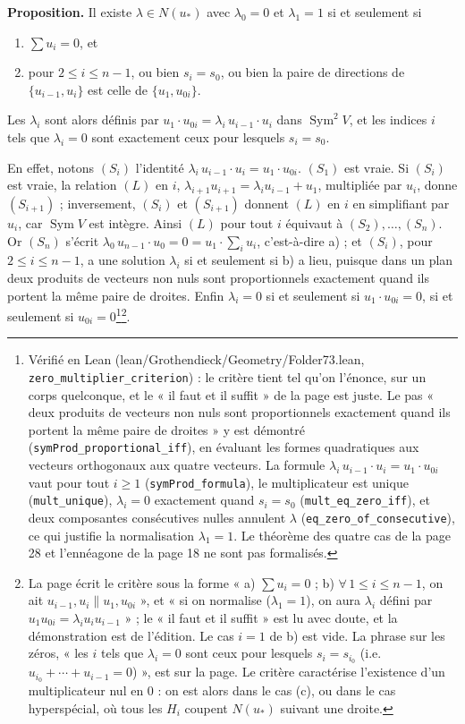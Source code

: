 \documentclass[11pt,a4paper]{article}
\begin{document}
\textbf{Proposition.} Il existe $\lambda \in N(u_*)$ avec $\lambda_0 = 0$ et
$\lambda_1 = 1$ si et seulement si
\begin{enumerate}
  \item[a)] $\sum u_i = 0$, et
  \item[b)] pour $2 \leqslant i \leqslant n-1$, ou bien $s_i = s_0$, ou bien
    la paire de directions de $\{u_{i-1}, u_i\}$ est celle de
    $\{u_1, u_{0i}\}$.
\end{enumerate}
Les $\lambda_i$ sont alors définis par $u_1 \cdot u_{0i} = \lambda_i\, u_{i-1}
\cdot u_i$ dans $\operatorname{Sym}^2 V$, et les indices $i$ tels que
$\lambda_i = 0$ sont exactement ceux pour lesquels $s_i = s_0$.

En effet, notons $(S_i)$ l'identité $\lambda_i\, u_{i-1} \cdot u_i = u_1 \cdot
u_{0i}$. $(S_1)$ est vraie. Si $(S_i)$ est vraie, la relation $(L)$ en $i$,
$\lambda_{i+1} u_{i+1} = \lambda_i u_{i-1} + u_1$, multipliée par $u_i$, donne
$(S_{i+1})$ ; inversement, $(S_i)$ et $(S_{i+1})$ donnent $(L)$ en $i$ en
simplifiant par $u_i$, car $\operatorname{Sym} V$ est intègre. Ainsi $(L)$ pour
tout $i$ équivaut à $(S_2), \ldots, (S_n)$. Or $(S_n)$ s'écrit
$\lambda_0\, u_{n-1} \cdot u_0 = 0 = u_1 \cdot \sum_i u_i$, c'est-à-dire a) ; et
$(S_i)$, pour $2 \leqslant i \leqslant n-1$, a une solution $\lambda_i$ si et
seulement si b) a lieu, puisque dans un plan deux produits de vecteurs non nuls
sont proportionnels exactement quand ils portent la même paire de droites.
Enfin $\lambda_i = 0$ si et seulement si $u_1 \cdot u_{0i} = 0$, si et
seulement si $u_{0i} = 0$\footnote{Vérifié en Lean
(lean/Grothendieck/Geometry/Folder73.lean, \texttt{zero\_multiplier\_criterion}) : le
critère tient tel qu'on l'énonce, sur un corps quelconque, et le « il faut et
il suffit » de la page est juste. Le pas « deux produits de vecteurs non nuls
sont proportionnels exactement quand ils portent la même paire de droites »
y est démontré (\texttt{symProd\_proportional\_iff}), en évaluant les formes
quadratiques aux vecteurs orthogonaux aux quatre vecteurs. La formule
$\lambda_i\, u_{i-1} \cdot u_i = u_1 \cdot u_{0i}$ vaut pour tout $i \geqslant 1$
(\texttt{symProd\_formula}), le multiplicateur est unique
(\texttt{mult\_unique}), $\lambda_i = 0$ exactement quand $s_i = s_0$
(\texttt{mult\_eq\_zero\_iff}), et deux composantes consécutives nulles
annulent $\lambda$ (\texttt{eq\_zero\_of\_consecutive}), ce qui justifie la
normalisation $\lambda_1 = 1$. Le théorème des quatre cas de la page 28 et
l'ennéagone de la page 18 ne sont pas formalisés.}\footnote{La page écrit le critère sous la forme
« a) $\sum u_i = 0$ ; b) $\forall\, 1 \leqslant i \leqslant n-1$, on ait
$u_{i-1}, u_i \parallel u_1, u_{0i}$ », et « si on normalise ($\lambda_1 = 1$),
on aura $\lambda_i$ défini par $u_1 u_{0i} = \lambda_i u_i u_{i-1}$ » ; le
« il faut et il suffit » est lu avec doute, et la démonstration est de
l'édition. Le cas $i = 1$ de b) est vide. La phrase sur les zéros,
« les $i$ tels que $\lambda_i = 0$ sont ceux pour lesquels $s_i = s_{i_0}$
(i.e.\ $u_{i_0} + \cdots + u_{i-1} = 0$) », est sur la page. Le critère
caractérise l'existence d'un multiplicateur nul en $0$ : on est alors dans le
cas (c), ou dans le cas hyperspécial, où tous les $H_i$ coupent $N(u_*)$
suivant une droite.}.
\end{document}
